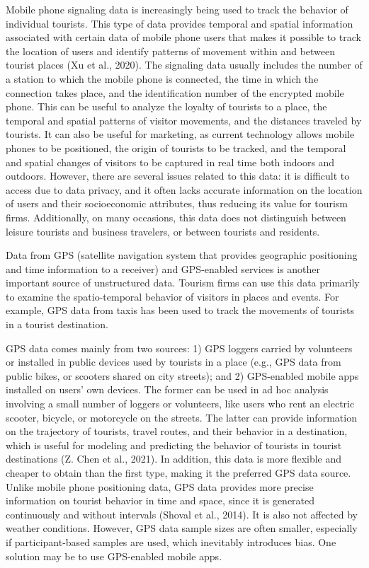 \documentclass[
  letterpaper,
  DIV=11,
  numbers=noendperiod]{scrreprt}
\begin{document}
Mobile phone signaling data is increasingly being used to track the
behavior of individual tourists. This type of data provides temporal and
spatial information associated with certain data of mobile phone users
that makes it possible to track the location of users and identify
patterns of movement within and between tourist places (Xu et al.,
2020). The signaling data usually includes the number of a station to
which the mobile phone is connected, the time in which the connection
takes place, and the identification number of the encrypted mobile
phone. This can be useful to analyze the loyalty of tourists to a place,
the temporal and spatial patterns of visitor movements, and the
distances traveled by tourists. It can also be useful for marketing, as
current technology allows mobile phones to be positioned, the origin of
tourists to be tracked, and the temporal and spatial changes of visitors
to be captured in real time both indoors and outdoors. However, there
are several issues related to this data: it is difficult to access due
to data privacy, and it often lacks accurate information on the location
of users and their socioeconomic attributes, thus reducing its value for
tourism firms. Additionally, on many occasions, this data does not
distinguish between leisure tourists and business travelers, or between
tourists and residents.

Data from GPS (satellite navigation system that provides geographic
positioning and time information to a receiver) and GPS-enabled services
is another important source of unstructured data. Tourism firms can use
this data primarily to examine the spatio-temporal behavior of visitors
in places and events. For example, GPS data from taxis has been used to
track the movements of tourists in a tourist destination.

GPS data comes mainly from two sources: 1) GPS loggers carried by
volunteers or installed in public devices used by tourists in a place
(e.g., GPS data from public bikes, or scooters shared on city streets);
and 2) GPS-enabled mobile apps installed on users' own devices. The
former can be used in ad hoc analysis involving a small number of
loggers or volunteers, like users who rent an electric scooter, bicycle,
or motorcycle on the streets. The latter can provide information on the
trajectory of tourists, travel routes, and their behavior in a
destination, which is useful for modeling and predicting the behavior of
tourists in tourist destinations (Z. Chen et al., 2021). In addition,
this data is more flexible and cheaper to obtain than the first type,
making it the preferred GPS data source. Unlike mobile phone positioning
data, GPS data provides more precise information on tourist behavior in
time and space, since it is generated continuously and without intervals
(Shoval et al., 2014). It is also not affected by weather conditions.
However, GPS data sample sizes are often smaller, especially if
participant-based samples are used, which inevitably introduces bias.
One solution may be to use GPS-enabled mobile apps.
\end{document}
